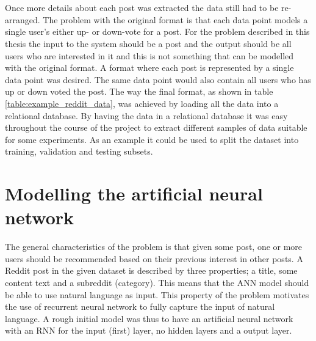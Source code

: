 \\\\
Once more details about each post was extracted the data still had to be re-arranged. The problem with the original format is that each data point models a single user's either up- or down-vote for a post. For the problem described in this thesis the input to the system should be a post and the output should be all users who are interested in it and this is not something that can be modelled with the original format. A format where each post is represented by a single data point was desired. The same data point would also contain all users who has up or down voted the post. The way the final format, as shown in table \ref{table:example_reddit_data}, was achieved by loading all the data into a relational database. By having the data in a relational database it was easy throughout the course of the project to extract different samples of data suitable for some experiments. As an example it could be used to split the dataset into training, validation and testing subsets.

\section{Modelling the artificial neural network}
The general characteristics of the problem is that given some post, one or more users should be recommended based on their previous interest in other posts. A Reddit post in the given dataset is described by three properties; a title, some content text and a subreddit (category). This means that the ANN model should be able to use natural language as input. This property of the problem motivates the use of recurrent neural network to fully capture the input of natural language. A rough initial model was thus to have an artificial neural network with an RNN for the input (first) layer, no hidden layers and a output layer.

